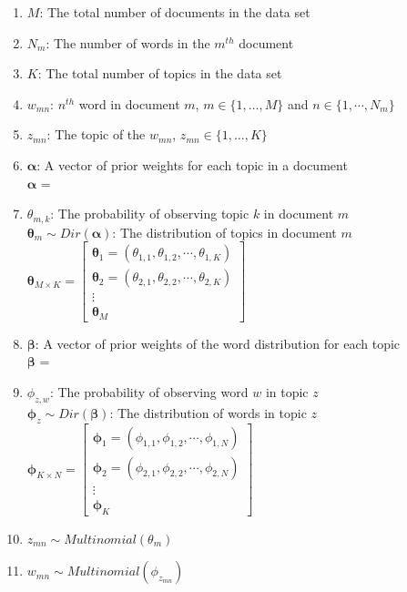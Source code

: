 \documentclass[]{article}
\begin{document}
\begin{enumerate}
\item $M$: The total number of documents in the data set
\item $N_m$: The number of words in the $m^{th}$ document
\item $K$: The total number of topics in the data set
\item $w_{mn}$: $n^{th}$ word in document $m$, $m \in \big\{1, \dots, M\big\}$ and $n \in \big\{1, \cdots, N_m\big\}$
\item $z_{mn}$: The topic of the $w_{mn}$, $z_{mn} \in \big\{1, \dots, K \big\}$
\item $\boldsymbol\alpha$: A vector of prior weights for each topic in a document\\
\quad $\boldsymbol\alpha$ = 
\item $\theta_{m, k}$: The probability of observing topic $k$ in document $m$\\
$\boldsymbol\theta_m \sim Dir(\boldsymbol\alpha)$: The distribution of topics in document $m$\\
\quad $\boldsymbol\theta_{M \times K}=
\begin{bmatrix}
\boldsymbol\theta_1= (\theta_{1,1}, \theta_{1,2}, \cdots, \theta_{1,K})\\
\boldsymbol\theta_2= (\theta_{2,1}, \theta_{2,2}, \cdots, \theta_{2,K})\\
\vdots\\
\boldsymbol\theta_M
\end{bmatrix}
$
\item $\boldsymbol\beta$: A vector of prior weights of the word distribution for each topic\\
\quad $\boldsymbol\beta$ = 
\item $\phi_{z, w}$: The probability of observing word $w$ in topic $z$\\
$\boldsymbol\phi_z \sim Dir(\boldsymbol\beta)$: The distribution of words in topic $z$\\
\quad $\boldsymbol\phi_{K \times N}=
\begin{bmatrix}
\boldsymbol\phi_1= (\phi_{1,1}, \phi_{1,2}, \cdots, \phi_{1,N})\\
\boldsymbol\phi_2= (\phi_{2,1}, \phi_{2,2}, \cdots, \phi_{2,N})\\
\vdots\\
\boldsymbol\phi_K
\end{bmatrix}
$
\item $z_{mn} \sim Multinomial(\theta_m)$
\item $w_{mn} \sim Multinomial(\phi_{z_{mn}})$
\end{enumerate}
\end{document}
